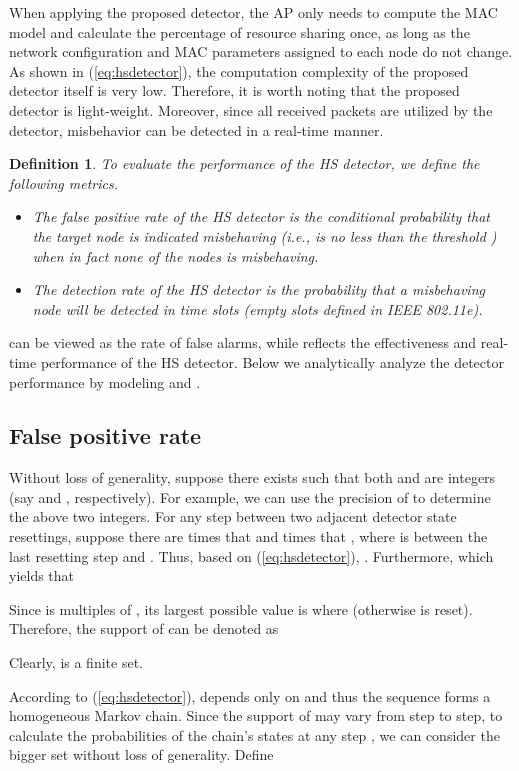 \documentclass[conference]{IEEEtran}
\newtheorem{definition}{{\bf Definition}}
\begin{document}
When applying the proposed detector, the AP only needs to compute the MAC model and calculate the percentage of resource sharing once, as long as the network configuration and MAC parameters assigned to each node do not change. As shown in (\ref{eq:hsdetector}), the computation complexity of the proposed detector itself is very low. Therefore, it is worth noting that the proposed detector is light-weight. Moreover, since all received packets are utilized by the detector, misbehavior can be detected in a real-time manner.

\begin{definition}\label{def:falseposrate}
To evaluate the performance of the HS detector, we define the following metrics.
\begin{itemize}
\item The \emph{false positive rate}  of the HS detector is the conditional probability that the target node is indicated misbehaving (i.e.,  is no less than the threshold ) when in fact none of the nodes is misbehaving.
\item The \emph{detection rate}  of the HS detector is the probability that a misbehaving node will be detected in  time slots (empty slots defined in IEEE 802.11e).
\end{itemize}
\end{definition}

 can be viewed as the rate of false alarms, while  reflects the effectiveness and real-time performance of the HS detector. Below we analytically analyze the detector performance by modeling  and .

\subsection{False positive rate}
Without loss of generality, suppose there exists  such that both  and  are integers (say  and , respectively). For example, we can use the precision of  to determine the above two integers. For any step  between two adjacent detector state resettings, suppose there are  times that  and  times that , where  is between the last resetting step and . Thus, based on (\ref{eq:hsdetector}), . Furthermore,  which yields that

Since  is multiples of , its largest possible value is  where  (otherwise  is reset). Therefore, the support of  can be denoted as

Clearly,  is a finite set.

According to (\ref{eq:hsdetector}),  depends only on  and thus the sequence  forms a homogeneous Markov chain. Since the support of  may vary from step to step, to calculate the probabilities of the chain's states at any step , we can consider the bigger set  without loss of generality. Define
\end{document}
